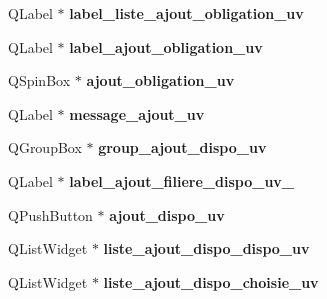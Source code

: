 \begin{DoxyCompactItemize}
\item 
\hypertarget{class_ui___administration_a88b825f66cf6616a4dc5f3901e72f43e}{Q\+Label $\ast$ {\bfseries label\+\_\+liste\+\_\+ajout\+\_\+obligation\+\_\+uv}}\label{class_ui___administration_a88b825f66cf6616a4dc5f3901e72f43e}

\item 
\hypertarget{class_ui___administration_aff7b97ef56584f53bc279f90a300f9de}{Q\+Label $\ast$ {\bfseries label\+\_\+ajout\+\_\+obligation\+\_\+uv}}\label{class_ui___administration_aff7b97ef56584f53bc279f90a300f9de}

\item 
\hypertarget{class_ui___administration_a9b5f20f8a329abc8a9443c42ed776801}{Q\+Spin\+Box $\ast$ {\bfseries ajout\+\_\+obligation\+\_\+uv}}\label{class_ui___administration_a9b5f20f8a329abc8a9443c42ed776801}

\item 
\hypertarget{class_ui___administration_ad5d00124f7e64659173c70e340f21182}{Q\+Label $\ast$ {\bfseries message\+\_\+ajout\+\_\+uv}}\label{class_ui___administration_ad5d00124f7e64659173c70e340f21182}

\item 
\hypertarget{class_ui___administration_a40a2ba1970b3d76f8b479f9207e55fc2}{Q\+Group\+Box $\ast$ {\bfseries group\+\_\+ajout\+\_\+dispo\+\_\+uv}}\label{class_ui___administration_a40a2ba1970b3d76f8b479f9207e55fc2}

\item 
\hypertarget{class_ui___administration_a41ef9add69c5226a5cc48f472deabcb3}{Q\+Label $\ast$ {\bfseries label\+\_\+ajout\+\_\+filiere\+\_\+dispo\+\_\+uv\+\_}}\label{class_ui___administration_a41ef9add69c5226a5cc48f472deabcb3}

\item 
\hypertarget{class_ui___administration_aa5d853e47511c272bb1d1375a977e6d4}{Q\+Push\+Button $\ast$ {\bfseries ajout\+\_\+dispo\+\_\+uv}}\label{class_ui___administration_aa5d853e47511c272bb1d1375a977e6d4}

\item 
\hypertarget{class_ui___administration_ad84526c75de8950e94d6240748a0545c}{Q\+List\+Widget $\ast$ {\bfseries liste\+\_\+ajout\+\_\+dispo\+\_\+dispo\+\_\+uv}}\label{class_ui___administration_ad84526c75de8950e94d6240748a0545c}

\item 
\hypertarget{class_ui___administration_a9976271193e115c688f524a76457c559}{Q\+List\+Widget $\ast$ {\bfseries liste\+\_\+ajout\+\_\+dispo\+\_\+choisie\+\_\+uv}}\label{class_ui___administration_a9976271193e115c688f524a76457c559}


\end{DoxyCompactItemize}
